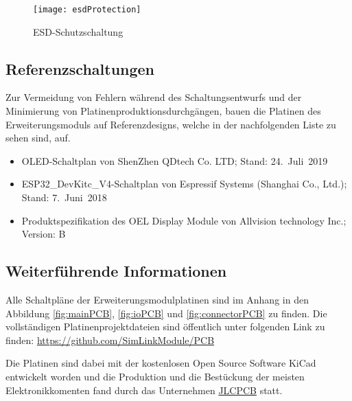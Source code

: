 \begin{figure}[h]
    \centering
    \texttt{[image: esdProtection]}
    \caption{\ac{ESD}-Schutzschaltung}
    \label{fig:esdProtection}
\end{figure}

\subsection{Referenzschaltungen}
Zur Vermeidung von Fehlern während des Schaltungsentwurfs und der Minimierung von Platinenproduktionsdurchgängen, bauen die Platinen des Erweiterungsmoduls auf Referenzdesigns, welche in der nachfolgenden Liste zu sehen sind, auf.

\begin{itemize}
    \item \acs{OLED}-Schaltplan von ShenZhen QDtech Co. LTD; Stand: 24.~Juli~2019
    \item ESP32\_DevKitc\_V4-Schaltplan von Espressif Systems (Shanghai Co., Ltd.); Stand: 7.~Juni~2018
    \item Produktspezifikation des OEL Display Module von Allvision technology Inc.; Version: B
\end{itemize}

\subsection{Weiterführende Informationen}

Alle Schaltpläne der Erweiterungsmodulplatinen sind im Anhang in den Abbildung \ref{fig:mainPCB}, \ref{fig:ioPCB} und  \ref{fig:connectorPCB} zu finden. Die vollständigen Platinenprojektdateien sind öffentlich unter folgenden Link zu finden: \url{https://github.com/SimLinkModule/PCB}

Die Platinen sind dabei mit der kostenlosen Open Source Software KiCad \cite{aboutkicad} entwickelt worden und die Produktion und die Bestückung der meisten Elektronikkomenten fand durch das Unternehmen \href{https://jlcpcb.com/}{JLCPCB} statt.

